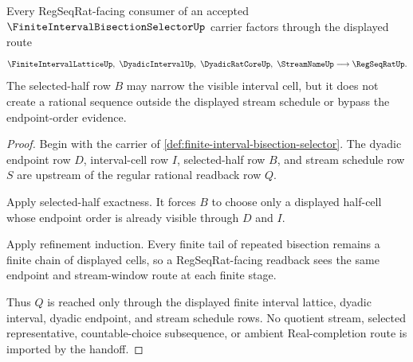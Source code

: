 \begin{theorem}
\label{thm:finite-interval-bisection-regseqrat-handoff}
Every RegSeqRat-facing consumer of an accepted $\FiniteIntervalBisectionSelectorUp$ carrier factors through the displayed route
$$
\FiniteIntervalLatticeUp,\ \DyadicIntervalUp,\ \DyadicRatCoreUp,\ \StreamNameUp
\longrightarrow
\RegSeqRatUp .
$$
The selected-half row $B$ may narrow the visible interval cell, but it does not create a rational sequence outside the displayed stream schedule or bypass the endpoint-order evidence.
\end{theorem}
\begin{proof}
Begin with the carrier of \autoref{def:finite-interval-bisection-selector}. The dyadic endpoint row $D$, interval-cell row $I$, selected-half row $B$, and stream schedule row $S$ are upstream of the regular rational readback row $Q$.

Apply selected-half exactness. It forces $B$ to choose only a displayed half-cell whose endpoint order is already visible through $D$ and $I$.

Apply refinement induction. Every finite tail of repeated bisection remains a finite chain of displayed cells, so a RegSeqRat-facing readback sees the same endpoint and stream-window route at each finite stage.

Thus $Q$ is reached only through the displayed finite interval lattice, dyadic interval, dyadic endpoint, and stream schedule rows. No quotient stream, selected representative, countable-choice subsequence, or ambient Real-completion route is imported by the handoff.
\end{proof}

